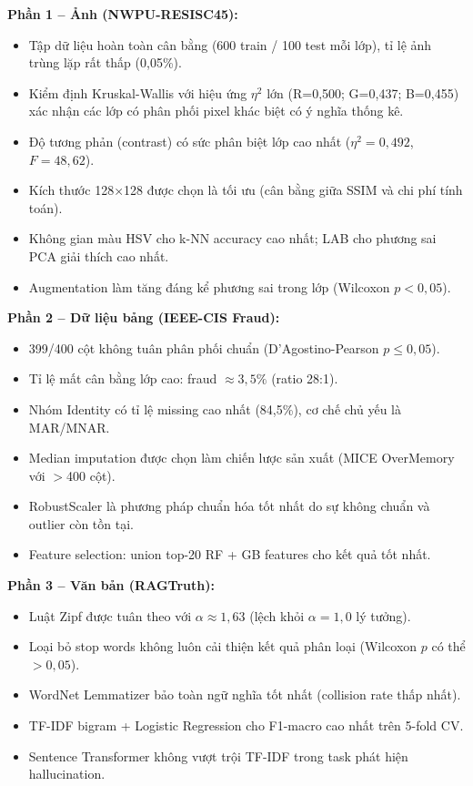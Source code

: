 \documentclass[12pt,a4paper]{article}
\let\oldtextbf\textbf
\renewcommand{\textbf}[1]{\oldtextbf{\textcolor{hcmublue}{#1}}}
\begin{document}
\textbf{Phần 1 -- Ảnh (NWPU-RESISC45):}
\begin{itemize}
    \item Tập dữ liệu hoàn toàn cân bằng (600 train / 100 test mỗi lớp), tỉ lệ ảnh trùng lặp rất thấp (0,05\%).
    \item Kiểm định Kruskal-Wallis với hiệu ứng $\eta^2$ lớn (R=0,500; G=0,437; B=0,455) xác nhận các lớp có phân phối pixel khác biệt có ý nghĩa thống kê.
    \item Độ tương phản (contrast) có sức phân biệt lớp cao nhất ($\eta^2 = 0{,}492$, $F = 48{,}62$).
    \item Kích thước 128×128 được chọn là tối ưu (cân bằng giữa SSIM và chi phí tính toán).
    \item Không gian màu HSV cho k-NN accuracy cao nhất; LAB cho phương sai PCA giải thích cao nhất.
    \item Augmentation làm tăng đáng kể phương sai trong lớp (Wilcoxon $p < 0{,}05$).
\end{itemize}

\textbf{Phần 2 -- Dữ liệu bảng (IEEE-CIS Fraud):}
\begin{itemize}
    \item 399/400 cột không tuân phân phối chuẩn (D'Agostino-Pearson $p \leq 0{,}05$).
    \item Tỉ lệ mất cân bằng lớp cao: fraud $\approx 3{,}5\%$ (ratio 28:1).
    \item Nhóm Identity có tỉ lệ missing cao nhất (84,5\%), cơ chế chủ yếu là MAR/MNAR.
    \item Median imputation được chọn làm chiến lược sản xuất (MICE OverMemory với $>$400 cột).
    \item RobustScaler là phương pháp chuẩn hóa tốt nhất do sự không chuẩn và outlier còn tồn tại.
    \item Feature selection: union top-20 RF + GB features cho kết quả tốt nhất.
\end{itemize}

\textbf{Phần 3 -- Văn bản (RAGTruth):}
\begin{itemize}
    \item Luật Zipf được tuân theo với $\alpha \approx 1{,}63$ (lệch khỏi $\alpha = 1{,}0$ lý tưởng).
    \item Loại bỏ stop words không luôn cải thiện kết quả phân loại (Wilcoxon $p$ có thể $> 0{,}05$).
    \item WordNet Lemmatizer bảo toàn ngữ nghĩa tốt nhất (collision rate thấp nhất).
    \item TF-IDF bigram + Logistic Regression cho F1-macro cao nhất trên 5-fold CV.
    \item Sentence Transformer không vượt trội TF-IDF trong task phát hiện hallucination.
\end{itemize}
\end{document}
